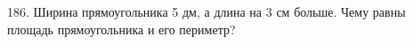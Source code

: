 186. Ширина прямоугольника 5 дм, а длина на 3 см больше. Чему равны площадь прямоугольника и его периметр?\\
